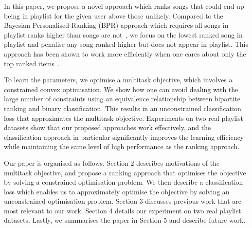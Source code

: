 In this paper, we propose a novel approach which ranks songs that could end up being in playlist for the 
given user above those unlikely.
Compared to the Bayesian Personalised Ranking (BPR) approach which requires all
songs in playlist ranks higher than songs are not~\cite{rendle2009bpr,mcfee2012million}, we focus on the lowest ranked
song in playlist and penalise any song ranked higher but does not appear in playlist.
This approach has been shown to work more efficiently when one cares about only the top ranked items~\cite{li2014top}.

To learn the parameters, we optimise a multitask objective,
which involves a constrained convex optimisation.
We show how one can avoid dealing with the large number of constraints using an equivalence relationship 
between bipartite ranking and binary classification.
This results in an unconstrained classification loss that approximates the multitask objective.
Experiments on two real playlist datasets show that our proposed approaches work effectively,
and the classification approach in particular significantly improves the learning efficiency 
while maintaining the same level of high performance as the ranking approach.

Our paper is organised as follows.
Section 2 describes motivations of the multitask objective, and propose a ranking approach 
that optimises the objective by solving a constrained optimisation problem.
We then describe a classification loss which enables us to approximately optimise the objective by
solving an unconstrained optimisation problem.
Section 3 discusses previous work that are most relevant to our work.
Section 4 details our experiment on two real playlist datasets.
Lastly, we summarises the paper in Section 5 and describe future work.
